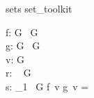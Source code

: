 \documentclass{article}
\begin{document}
\begin{zsection}
\SECTION sets \parents set\_toolkit
\end{zsection}

\begin{zed}
   [G]
\end{zed}

\begin{axdef}
   f: G \rel \power~G \\
   g: G \fun \power~G \\
   v: G \\
   r: \finset~ G \\
   s: \finset_1~ G
\where
   f~v \cap g~v = \emptyset
\end{axdef}
\end{document}

